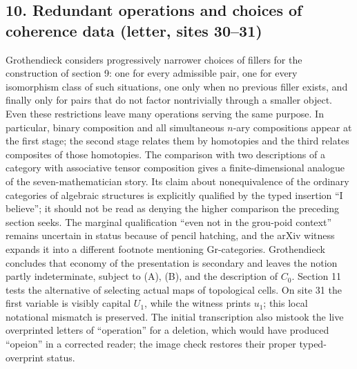 \subsection*{10. Redundant operations and choices of coherence data (letter, sites 30--31)}
Grothendieck considers progressively narrower choices of fillers for the construction of section 9: one for every admissible pair, one for every isomorphism class of such situations, one only when no previous filler exists, and finally only for pairs that do not factor nontrivially through a smaller object. Even these restrictions leave many operations serving the same purpose. In particular, binary composition and all simultaneous $n$-ary compositions appear at the first stage; the second stage relates them by homotopies and the third relates composites of those homotopies. The comparison with two descriptions of a category with associative tensor composition gives a finite-dimensional analogue of the seven-mathematician story. Its claim about nonequivalence of the ordinary categories of algebraic structures is explicitly qualified by the typed insertion ``I believe''; it should not be read as denying the higher comparison the preceding section seeks. The marginal qualification ``even not in the grou-poid context'' remains uncertain in status because of pencil hatching, and the arXiv witness expands it into a different footnote mentioning Gr-categories. Grothendieck concludes that economy of the presentation is secondary and leaves the notion partly indeterminate, subject to (A), (B), and the description of $C_0$. Section 11 tests the alternative of selecting actual maps of topological cells. On site 31 the first variable is visibly capital $U_1$, while the witness prints $u_1$; this local notational mismatch is preserved. The initial transcription also mistook the live overprinted letters of ``operation'' for a deletion, which would have produced ``opeion'' in a corrected reader; the image check restores their proper typed-overprint status.

